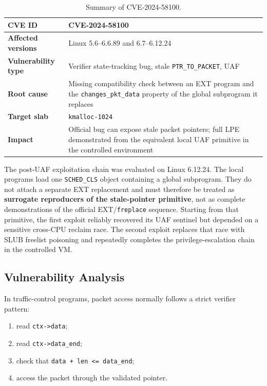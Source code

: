 \documentclass[../main.tex]{subfiles}
\begin{document}
\begin{table}[H]
\centering
\begin{tabularx}{\textwidth}{|l|X|}
\hline
\textbf{CVE ID} & CVE-2024-58100 \\
\hline
\textbf{Affected versions} & Linux 5.6--6.6.89 and 6.7--6.12.24 \\
\hline
\textbf{Vulnerability type} & Verifier state-tracking bug, stale \texttt{PTR\_TO\_PACKET}, UAF \\
\hline
\textbf{Root cause} & Missing compatibility check between an EXT program and the \texttt{changes\_pkt\_data} property of the global subprogram it replaces \\
\hline
\textbf{Target slab} & \texttt{kmalloc-1024} \\
\hline
\textbf{Impact} & Official bug can expose stale packet pointers; full LPE demonstrated from the equivalent local UAF primitive in the controlled environment \\
\hline
\end{tabularx}
\caption{Summary of CVE-2024-58100.}
\end{table}

The post-UAF exploitation chain was evaluated on Linux 6.12.24. The local programs load one \texttt{SCHED\_CLS} object containing a global subprogram. They do not attach a separate EXT replacement and must therefore be treated as \textbf{surrogate reproducers of the stale-pointer primitive}, not as complete demonstrations of the official EXT/\texttt{freplace} sequence. Starting from that primitive, the first exploit reliably recovered its UAF sentinel but depended on a sensitive cross-CPU reclaim race. The second exploit replaces that race with SLUB freelist poisoning and repeatedly completes the privilege-escalation chain in the controlled VM.

\subsection{Vulnerability Analysis}

In traffic-control programs, packet access normally follows a strict verifier pattern:

\begin{enumerate}
    \item read \texttt{ctx->data};
    \item read \texttt{ctx->data\_end};
    \item check that \texttt{data + len <= data\_end};
    \item access the packet through the validated pointer.
\end{enumerate}
\end{document}

